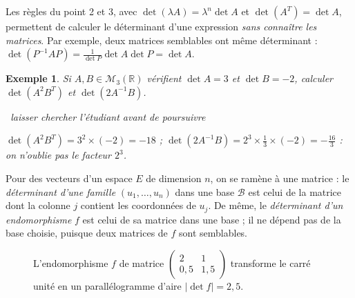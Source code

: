 \documentclass[a4paper,11pt]{article}
\numberwithin{equation}{section}
\numberwithin{figure}{section}
\numberwithin{table}{section}
\theoremstyle{enonce}
\theoremstyle{exemple}
\newtheorem{exemple}[definition]{Exemple}
\theoremstyle{remarque}
\newcommand{\chercher}{\par\smallskip\noindent{\color{Filet}\rule[0.5ex]{1.2cm}{0.4pt}}\
  {\footnotesize\sffamily\itshape\color{Gris}laisser chercher l'étudiant avant de poursuivre}\par\smallskip}
\newcommand{\marge}[1]{\leavevmode\marginpar{\raggedleft\scriptsize\sffamily\color{Gris}\textls[100]{\MakeUppercase{#1}}}\ignorespaces}
\newcommand{\R}{\mathbb{R}}
\begin{document}
\begin{enpratique}
Les règles du point 2 et 3, avec $\det(\lambda A)=\lambda^n\det A$ et $\det(A^T)=\det A$, permettent de calculer le
déterminant d'une expression \emph{sans connaître les matrices}. Par exemple, deux matrices semblables ont même
déterminant : $\det(P^{-1}AP)=\frac1{\det P}\det A\det P=\det A$.
\end{enpratique}

\marge{Ensemble}
\begin{exemple}
Si $A,B\in\mathcal M_3(\R)$ vérifient $\det A=3$ et $\det B=-2$, calculer $\det(A^2B^T)$ et $\det(2A^{-1}B)$.
\chercher
$\det(A^2B^T)=3^2\times(-2)=-18$ ; $\det(2A^{-1}B)=2^3\times\frac13\times(-2)=-\frac{16}3$ : on n'oublie pas le facteur
$2^3$.
\end{exemple}

\marge{Expliquer}
Pour des vecteurs d'un espace $E$ de dimension $n$, on se ramène à une matrice : le \emph{déterminant d'une famille}
$(u_1,\dots,u_n)$ dans une base $\mathcal B$ est celui de la matrice dont la colonne $j$ contient les coordonnées de
$u_j$. De même, le \emph{déterminant d'un endomorphisme} $f$ est celui de sa matrice dans une base ; il ne dépend pas
de la base choisie, puisque deux matrices de $f$ sont semblables.

\begin{figure}[H]
\centering
{}
\caption{L'endomorphisme $f$ de matrice $\begin{pmatrix}2&1\\0{,}5&1{,}5\end{pmatrix}$ transforme le carré unité en un
parallélogramme d'aire $|\det f|=2{,}5$.}\label{fig:endo}
\end{figure}
\end{document}
